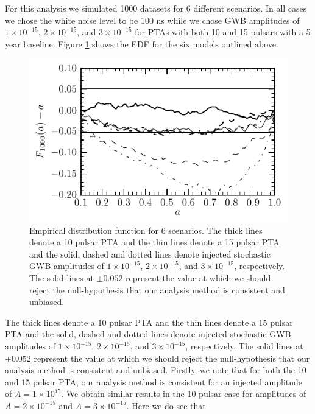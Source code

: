 \documentclass[iop]{emulateapj} \usepackage{apjfonts}
\begin{document}
For this analysis we simulated 1000 datasets for 6 different
scenarios. In all cases we chose the white noise level to be 100 ns
while we chose GWB amplitudes of $1\times 10^{-15}$, $2\times
10^{-15}$, and $3\times 10^{-15}$ for PTAs with both 10 and 15 pulsars
with a 5 year baseline. Figure \ref{fig:combined_edf} shows the EDF
for the six models outlined above.
\begin{figure}[!h]
  \begin{center}
\includegraphics[width=\columnwidth]{edf_all.pdf}
  \end{center}
  \caption{Empirical distribution function for 6 scenarios. The thick
lines denote a 10 pulsar PTA and the thin lines denote a 15 pulsar PTA
and the solid, dashed and dotted lines denote injected stochastic GWB
amplitudes of $1\times 10^{-15}$, $2\times 10^{-15}$, and $3\times
10^{-15}$, respectively. The solid lines at $\pm 0.052$ represent the
value at which we should reject the null-hypothesis that our analysis
method is consistent and unbiased. } \label{fig:combined_edf}
\end{figure}
The thick lines denote a 10 pulsar PTA and the thin lines denote a 15
pulsar PTA and the solid, dashed and dotted lines denote injected
stochastic GWB amplitudes of $1\times 10^{-15}$, $2\times 10^{-15}$,
and $3\times 10^{-15}$, respectively. The solid lines at $\pm 0.052$
represent the value at which we should reject the null-hypothesis that
our analysis method is consistent and unbiased. Firstly, we note that
for both the 10 and 15 pulsar PTA, our analysis method is consistent
for an injected amplitude of $A=1\times 10^{15}$. We obtain similar results in the 10 pulsar case for amplitudes
of $A=2\times 10^{-15}$ and $A=3\times 10^{-15}$. Here we do see that
\end{document}
